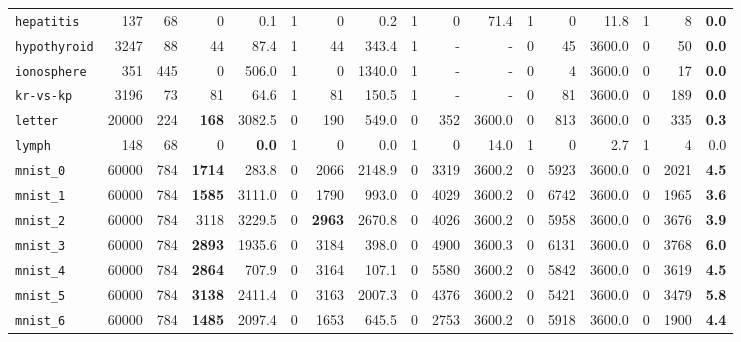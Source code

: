 \begin{tabular}{lccrrrrrrrrrrrrrr}
\texttt{hepatitis} & \multicolumn{1}{r}{137} & \multicolumn{1}{r}{68}  & 0 & 0.1 & 1 & 0 & 0.2 & 1 & 0 & 71.4 & 1 & 0 & 11.8 & 1 & 8 & \textbf{0.0}\\
\texttt{hypothyroid} & \multicolumn{1}{r}{3247} & \multicolumn{1}{r}{88}  & 44 & 87.4 & 1 & 44 & 343.4 & 1 & - & - & 0 & 45 & 3600.0 & 0 & 50 & \textbf{0.0}\\
\texttt{ionosphere} & \multicolumn{1}{r}{351} & \multicolumn{1}{r}{445}  & 0 & 506.0 & 1 & 0 & 1340.0 & 1 & - & - & 0 & 4 & 3600.0 & 0 & 17 & \textbf{0.0}\\
\texttt{kr-vs-kp} & \multicolumn{1}{r}{3196} & \multicolumn{1}{r}{73}  & 81 & 64.6 & 1 & 81 & 150.5 & 1 & - & - & 0 & 81 & 3600.0 & 0 & 189 & \textbf{0.0}\\
\texttt{letter} & \multicolumn{1}{r}{20000} & \multicolumn{1}{r}{224}  & \textbf{168} & 3082.5 & 0 & 190 & 549.0 & 0 & 352 & 3600.0 & 0 & 813 & 3600.0 & 0 & 335 & \textbf{0.3}\\
\texttt{lymph} & \multicolumn{1}{r}{148} & \multicolumn{1}{r}{68}  & 0 & \textbf{0.0} & 1 & 0 & 0.0 & 1 & 0 & 14.0 & 1 & 0 & 2.7 & 1 & 4 & 0.0\\
\texttt{mnist\_0} & \multicolumn{1}{r}{60000} & \multicolumn{1}{r}{784}  & \textbf{1714} & 283.8 & 0 & 2066 & 2148.9 & 0 & 3319 & 3600.2 & 0 & 5923 & 3600.0 & 0 & 2021 & \textbf{4.5}\\
\texttt{mnist\_1} & \multicolumn{1}{r}{60000} & \multicolumn{1}{r}{784}  & \textbf{1585} & 3111.0 & 0 & 1790 & 993.0 & 0 & 4029 & 3600.2 & 0 & 6742 & 3600.0 & 0 & 1965 & \textbf{3.6}\\
\texttt{mnist\_2} & \multicolumn{1}{r}{60000} & \multicolumn{1}{r}{784}  & 3118 & 3229.5 & 0 & \textbf{2963} & 2670.8 & 0 & 4026 & 3600.2 & 0 & 5958 & 3600.0 & 0 & 3676 & \textbf{3.9}\\
\texttt{mnist\_3} & \multicolumn{1}{r}{60000} & \multicolumn{1}{r}{784}  & \textbf{2893} & 1935.6 & 0 & 3184 & 398.0 & 0 & 4900 & 3600.3 & 0 & 6131 & 3600.0 & 0 & 3768 & \textbf{6.0}\\
\texttt{mnist\_4} & \multicolumn{1}{r}{60000} & \multicolumn{1}{r}{784}  & \textbf{2864} & 707.9 & 0 & 3164 & 107.1 & 0 & 5580 & 3600.2 & 0 & 5842 & 3600.0 & 0 & 3619 & \textbf{4.5}\\
\texttt{mnist\_5} & \multicolumn{1}{r}{60000} & \multicolumn{1}{r}{784}  & \textbf{3138} & 2411.4 & 0 & 3163 & 2007.3 & 0 & 4376 & 3600.2 & 0 & 5421 & 3600.0 & 0 & 3479 & \textbf{5.8}\\
\texttt{mnist\_6} & \multicolumn{1}{r}{60000} & \multicolumn{1}{r}{784}  & \textbf{1485} & 2097.4 & 0 & 1653 & 645.5 & 0 & 2753 & 3600.2 & 0 & 5918 & 3600.0 & 0 & 1900 & \textbf{4.4}\\

\end{tabular}
